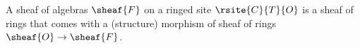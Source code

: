 \begin{definition}
A sheaf of algebras $\sheaf{F}$ on a ringed site $\rsite{C}{T}{O}$ 
is a sheaf of rings that comes with a (structure) morphism 
of sheaf of rings $\sheaf{O} \rightarrow \sheaf{F}$.
\end{definition}